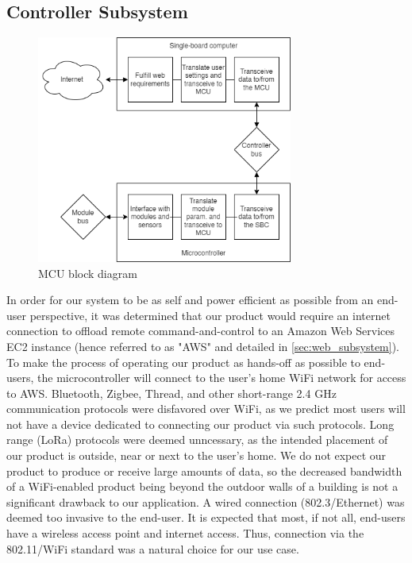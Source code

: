 \subsection{Controller Subsystem}
\label{sec:controller_subsystem}
\begin{figure}[H]
    \caption{MCU block diagram}
    \label{mcu_block_diagram}
    \centering
    \includegraphics[width=0.75\textwidth]{images/mcu_block_diagram.png}
\end{figure}
\begin{flushleft}
    In order for our system to be as self and power efficient as
    possible from an end-user perspective, it was determined that our product
    would require an internet connection to offload remote command-and-control
    to an Amazon Web Services EC2 instance (hence referred to as "AWS" and detailed in
    \autoref{sec:web_subsystem}). To make the process of operating our product 
    as hands-off as possible to end-users, the microcontroller will connect to
    the user's home WiFi network for access to AWS. Bluetooth, Zigbee, Thread,
    and other short-range 2.4 GHz communication protocols were disfavored over
    WiFi, as we predict most users will not have a device dedicated to
    connecting our product via such protocols. Long range (LoRa) protocols were
    deemed unncessary, as the intended placement of our product is outside, 
    near or next to the user's home. We do not expect our product to produce
    or receive large amounts of data, so the decreased bandwidth of a
    WiFi-enabled product being beyond the outdoor walls of a building
    is not a significant drawback to our application. A wired connection
    (802.3/Ethernet) was deemed too invasive to the end-user. It is expected
    that most, if not all, end-users have a wireless access point and internet
    access. Thus, connection via the 802.11/WiFi standard was a natural choice
    for our use case.
\end{flushleft}
